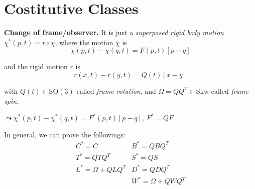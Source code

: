 
\vspace{-1em}


\section{\color{red}Costitutive Classes}


\textbf{Change of frame/observer.} It is just a \emph{superposed rigid body motion} $\chi^*(p,t)=r\circ \chi$, where the motion $\chi$ is
\begin{equation*}
\chi(p,t)-\chi(q,t)=F(p,t)[p-q]
\end{equation*}

and the rigid motion $r$ is
\begin{equation*}
r(x,t)-r(y,t)=Q(t)[x-y]
\end{equation*}

with $Q(t)\in\text{SO}(3)$ called \emph{frame-rotation}, and $\Omega=\dot{Q}Q^T\in\text{Skw}$ called \emph{frame-spin}.
\vspace{-0.5em}
\begin{Figure}
\end{Figure}
\vspace{-0.5em}
$\leadsto \chi^*(p,t)-\chi^*(q,t)=F^*(p,t)[p-q],\,\boxed{F^*=QF}$

\smallskip

In general, we can prove the followings:
\begin{equation*}
\begin{array}{ll}
C^*=C & B^*=QBQ^T \\
T^*=QTQ^T & S^*=QS \\
L^*=\Omega+QLQ^T & D^*=QDQ^T \\ 
&W^*=\Omega+QWQ^T \\
\end{array} \tag{$\circledast$}
\end{equation*}

